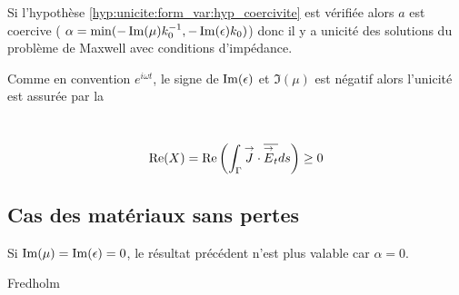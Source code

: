   Si l'hypothèse \ref{hyp:unicite:form_var:hyp_coercivite} est vérifiée alors \(a\) est coercive ( \(\alpha = \min(-\operatorname{Im}(\mu)k_0^{-1},-\operatorname{Im}(\epsilon)k_0)\)) donc il y a unicité des solutions du problème de Maxwell avec conditions d'impédance.

  Comme en convention \(e^{i\omega t}\), le signe de \(\operatorname{Im}(\epsilon)\) et \(\Im(\mu)\) est négatif
  alors l'unicité est assurée par la
  \begin{defn}~\\
    \begin{equation}\label{eq:unicite:form_var:cgu}
      \operatorname{Re}(X) = \operatorname{Re}\left(\int_\Gamma {\overset{\rightarrow}{J}} \cdot {\overline{{\overset{\rightarrow}{E}}_t}} ds\right) \ge 0
    \end{equation}
  \end{defn}

\subsection{Cas des matériaux sans pertes}

  Si \(\operatorname{Im}(\mu) = \operatorname{Im}(\epsilon) = 0\), le résultat précédent n'est plus valable car \(\alpha = 0\).

  \begin{REF}
      Fredholm
  \end{REF}
